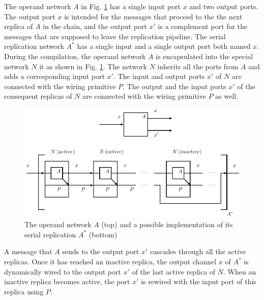 The operand network $A$ in Fig. \ref{fig:ffp_new} has a single input port $x$ and two output ports. The output port $x$ is intended for the messages that proceed to the the next replica of $A$ in the chain, and the output port $x'$ is a complement port for the messages that are supposed to leave the replication pipeline. The serial replication network $A^{*}$ has a single input and a single output port both named $x$. During the compilation, the operand network $A$ is encapsulated into the special network $N$ it as shown in Fig. \ref{fig:ffp_new}. The network $N$ inherits all the ports from $A$ and adds a corresponding input port $x'$. The input and output ports $x'$ of $N$ are connected with the wiring primitive $P$. The output and the input ports $x'$ of the consequent replicas of $N$ are connected with the wiring primitive $P$ as well.
\begin{figure}[h!]
\centering
\includegraphics[scale=0.8]{figs/chapter_04_ffp_new.pdf}
\caption{The operand network $A$ (top) and a possible implementation of its serial replication $A^{*}$ (bottom)}
\label{fig:ffp_new}
\end{figure}
A message that $A$ sends to the output port $x'$ cascades through all the active replicas. Once it has reached an inactive replica, the output channel $x$ of $A^{*}$ is dynamically wired to the output port $x'$ of the last active replica of $N$. When an inactive replica becomes active, the port $x'$ is rewired with the input port of this replica using $P$.



%



